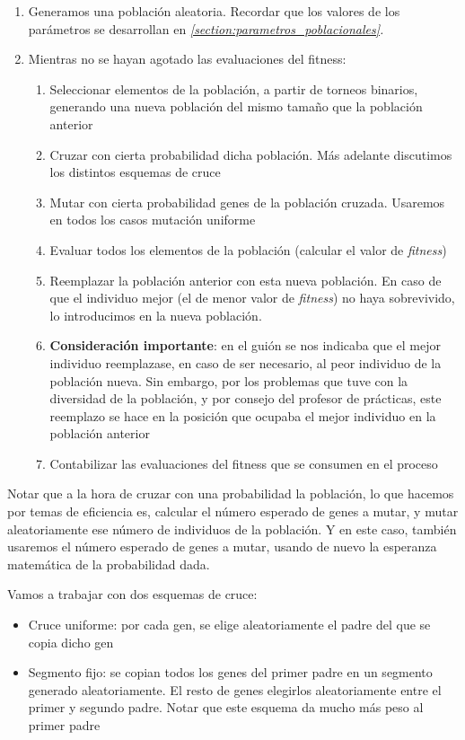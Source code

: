 \documentclass[11pt]{article}
\begin{document}
\begin{enumerate}
    \item Generamos una población aleatoria. Recordar que los valores de los parámetros se desarrollan en \emph{\ref{section:parametros_poblacionales}. }
    \item Mientras no se hayan agotado las evaluaciones del fitness:
        \begin{enumerate}
            \item Seleccionar elementos de la población, a partir de torneos binarios, generando una nueva población del mismo tamaño que la población anterior
            \item Cruzar con cierta probabilidad dicha población. Más adelante discutimos los distintos esquemas de cruce
            \item Mutar con cierta probabilidad genes de la población cruzada. Usaremos en todos los casos mutación uniforme
            \item Evaluar todos los elementos de la población (calcular el valor de \emph{fitness})
            \item Reemplazar la población anterior con esta nueva población. En caso de que el individuo mejor (el de menor valor de \emph{fitness}) no haya sobrevivido, lo introducimos en la nueva población.
            \item \textbf{Consideración importante}: en el guión se nos indicaba que el mejor individuo reemplazase, en caso de ser necesario, al peor individuo de la población nueva. Sin embargo, por los problemas que tuve con la diversidad de la población, y por consejo del profesor de prácticas, este reemplazo se hace en la posición que ocupaba el mejor individuo en la población anterior
            \item Contabilizar las evaluaciones del fitness que se consumen en el proceso
    \end{enumerate}
\end{enumerate}

Notar que a la hora de cruzar con una probabilidad la población, lo que hacemos por temas de eficiencia es, calcular el número esperado de genes a mutar, y mutar aleatoriamente ese número de individuos de la población. Y en este caso, también usaremos el número esperado de genes a mutar, usando de nuevo la esperanza matemática de la probabilidad dada.

Vamos a trabajar con dos esquemas de cruce:

\begin{itemize}
    \item Cruce uniforme: por cada gen, se elige aleatoriamente el padre del que se copia dicho gen
    \item Segmento fijo: se copian todos los genes del primer padre en un segmento generado aleatoriamente. El resto de genes elegirlos aleatoriamente entre el primer y segundo padre. Notar que este esquema da mucho más peso al primer padre
\end{itemize}
\end{document}
